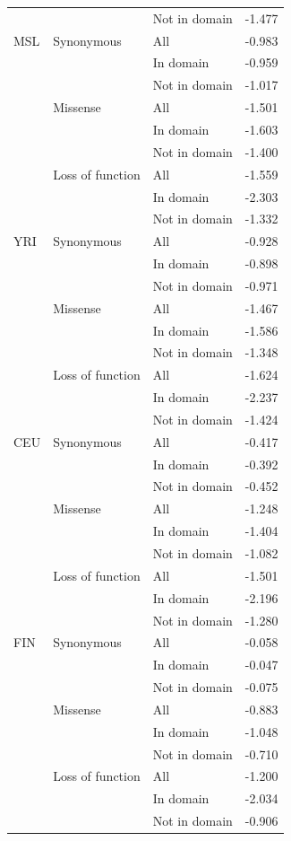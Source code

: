 \documentclass[]{article}
\begin{document}
\begin{longtable}[t]{lllr}
 &  & Not in domain & -1.477\\
\addlinespace
MSL & Synonymous & All & -0.983\\
 &  & In domain & -0.959\\
 &  & Not in domain & -1.017\\
 & Missense & All & -1.501\\
 &  & In domain & -1.603\\
 &  & Not in domain & -1.400\\
 & Loss of function & All & -1.559\\
 &  & In domain & -2.303\\
 &  & Not in domain & -1.332\\
\addlinespace
YRI & Synonymous & All & -0.928\\
 &  & In domain & -0.898\\
 &  & Not in domain & -0.971\\
 & Missense & All & -1.467\\
 &  & In domain & -1.586\\
 &  & Not in domain & -1.348\\
 & Loss of function & All & -1.624\\
 &  & In domain & -2.237\\
 &  & Not in domain & -1.424\\
\addlinespace
CEU & Synonymous & All & -0.417\\
 &  & In domain & -0.392\\
 &  & Not in domain & -0.452\\
 & Missense & All & -1.248\\
 &  & In domain & -1.404\\
 &  & Not in domain & -1.082\\
 & Loss of function & All & -1.501\\
 &  & In domain & -2.196\\
 &  & Not in domain & -1.280\\
\addlinespace
FIN & Synonymous & All & -0.058\\
 &  & In domain & -0.047\\
 &  & Not in domain & -0.075\\
 & Missense & All & -0.883\\
 &  & In domain & -1.048\\
 &  & Not in domain & -0.710\\
 & Loss of function & All & -1.200\\
 &  & In domain & -2.034\\
 &  & Not in domain & -0.906\\

\end{longtable}
\end{document}
